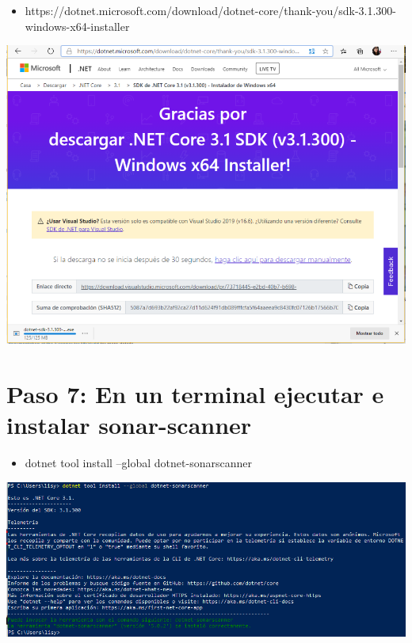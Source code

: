 \begin{itemize}
    \item  https://dotnet.microsoft.com/download/dotnet-core/thank-you/sdk-3.1.300-windows-x64-installer
\end{itemize}
\begin{center}
\includegraphics[width=\columnwidth]{images/10}\newline
\end{center}

\section{Paso 7: En un terminal ejecutar e instalar sonar-scanner} 
\begin{itemize}
    \item  dotnet tool install --global dotnet-sonarscanner
\end{itemize}
\begin{center}
\includegraphics[width=\columnwidth]{images/11}\newline
\end{center}
